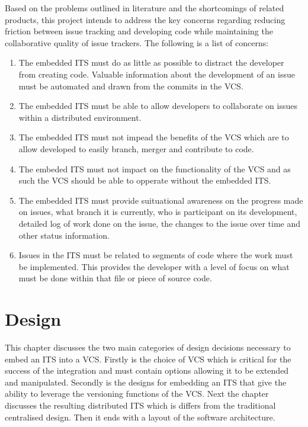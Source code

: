 \documentclass{mproj}
\begin{document}
Based on the problems outlined in literature and the shortcomings of related products, this project intends to address the key concerns regarding reducing friction between issue tracking and developing code while maintaining the collaborative quality of issue trackers. The following is a list of concerns:

\begin{enumerate}
  \item The embedded ITS must do as little as possible to distract the developer from creating code. Valuable information about the development of an issue must be automated and drawn from the commits in the VCS.
  \item The embedded ITS must be able to allow developers to collaborate on issues within a distributed environment.
  \item The embedded ITS must not impead the benefits of the VCS which are to allow developed to easily branch, merger and contribute to code.
  \item The embeded ITS must not impact on the functionality of the VCS and as such the VCS should be able to opperate without the embedded ITS.
  \item The embedded ITS must provide suituational awareness on the progress made on issues, what branch it is currently, who is participant on its development, detailed log of work done on the issue, the changes to the issue over time and other status information.
  \item Issues in the ITS must be related to segments of code where the work must be implemented. This provides the developer with a level of focus on what must be done within that file or piece of source code.
\end{enumerate}



\chapter{Design}\label{design}

This chapter discusses the two main categories of design decisions necessary to embed an ITS into a VCS. Firstly is the choice of VCS which is critical for the success of the integration and must contain options allowing it to be extended and manipulated. Secondly is the designs for embedding an ITS that give the ability to leverage the versioning functions of the VCS. Next the chapter discusses the resulting distributed ITS which is differs from the traditional centralised design. Then it ends with a layout of the software architecture.
\end{document}
